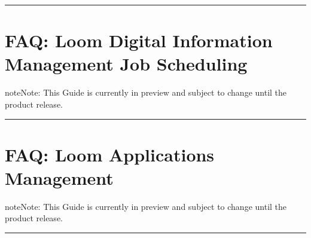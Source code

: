 \documentclass[letterpaper,10pt,english]{sphinxmanual}
\begin{document}
\bigskip\hrule\bigskip



\chapter{FAQ: Loom Digital Information Management Job Scheduling}
\label{\detokenize{loom_trbs_faq:faq-loom-digital-information-management-job-scheduling}}\label{\detokenize{loom_trbs_faq:faq-loom-job-scheduling}}
\begin{sphinxadmonition}{note}{Note:}
This Guide is currently in preview and subject to change until the product release.
\end{sphinxadmonition}


\bigskip\hrule\bigskip



\chapter{FAQ: Loom Applications Management}
\label{\detokenize{loom_trbs_faq:faq-loom-app-mngt}}\label{\detokenize{loom_trbs_faq:faq-loom-applications-management}}
\begin{sphinxadmonition}{note}{Note:}
This Guide is currently in preview and subject to change until the product release.
\end{sphinxadmonition}


\bigskip\hrule\bigskip
\end{document}

